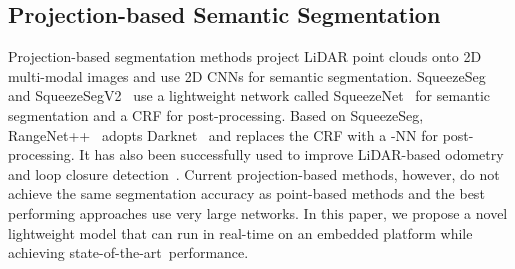 \documentclass[letterpaper, 10 pt, journal, twoside]{ieeetran}
\def\sArt{{state-of-the-art~}}
\begin{document}
\subsection{Projection-based Semantic Segmentation}\label{sec:relwork_proj}
Projection-based segmentation methods project LiDAR point clouds onto 2D multi-modal images and use 2D CNNs for semantic segmentation. SqueezeSeg~\cite{wu2018squeezeseg} and 
SqueezeSegV2~\cite{wu2019squeezesegv2} 
use a lightweight network called SqueezeNet~\cite{iandola2016squeezenet}
for semantic segmentation and a CRF for post-processing.
Based on SqueezeSeg,  RangeNet++~\cite{milioto2019rangenet++} adopts Darknet~\cite{redmon2018yolov3} and replaces the CRF with a -NN for post-processing.
It has also been successfully used to improve LiDAR-based odometry~\cite{chen2019suma++} and loop closure detection~\cite{chen2020overlapnet}.
Current projection-based methods, however, do not achieve the same segmentation accuracy as point-based methods and the best performing approaches use very large networks. In this paper, we propose a novel lightweight model that can run in real-time on an embedded platform while achieving \sArt performance.
\end{document}
